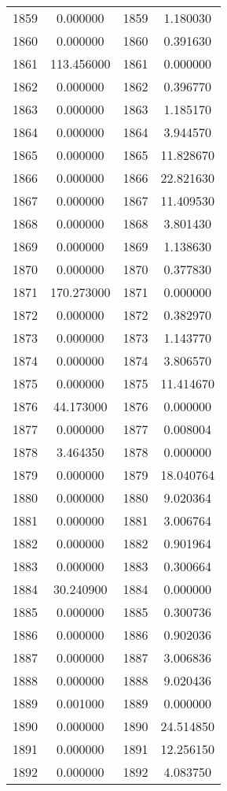 \documentclass[12pt]{article}
\begin{document}
\begin{longtable}{@{}cccc@{}}
1859 & 0.000000 & 1859 & 1.180030 \\
1860 & 0.000000 & 1860 & 0.391630 \\
1861 & 113.456000 & 1861 & 0.000000 \\
1862 & 0.000000 & 1862 & 0.396770 \\
1863 & 0.000000 & 1863 & 1.185170 \\
1864 & 0.000000 & 1864 & 3.944570 \\
1865 & 0.000000 & 1865 & 11.828670 \\
1866 & 0.000000 & 1866 & 22.821630 \\
1867 & 0.000000 & 1867 & 11.409530 \\
1868 & 0.000000 & 1868 & 3.801430 \\
1869 & 0.000000 & 1869 & 1.138630 \\
1870 & 0.000000 & 1870 & 0.377830 \\
1871 & 170.273000 & 1871 & 0.000000 \\
1872 & 0.000000 & 1872 & 0.382970 \\
1873 & 0.000000 & 1873 & 1.143770 \\
1874 & 0.000000 & 1874 & 3.806570 \\
1875 & 0.000000 & 1875 & 11.414670 \\
1876 & 44.173000 & 1876 & 0.000000 \\
1877 & 0.000000 & 1877 & 0.008004 \\
1878 & 3.464350 & 1878 & 0.000000 \\
1879 & 0.000000 & 1879 & 18.040764 \\
1880 & 0.000000 & 1880 & 9.020364 \\
1881 & 0.000000 & 1881 & 3.006764 \\
1882 & 0.000000 & 1882 & 0.901964 \\
1883 & 0.000000 & 1883 & 0.300664 \\
1884 & 30.240900 & 1884 & 0.000000 \\
1885 & 0.000000 & 1885 & 0.300736 \\
1886 & 0.000000 & 1886 & 0.902036 \\
1887 & 0.000000 & 1887 & 3.006836 \\
1888 & 0.000000 & 1888 & 9.020436 \\
1889 & 0.001000 & 1889 & 0.000000 \\
1890 & 0.000000 & 1890 & 24.514850 \\
1891 & 0.000000 & 1891 & 12.256150 \\
1892 & 0.000000 & 1892 & 4.083750 \\

\end{longtable}
\end{document}
